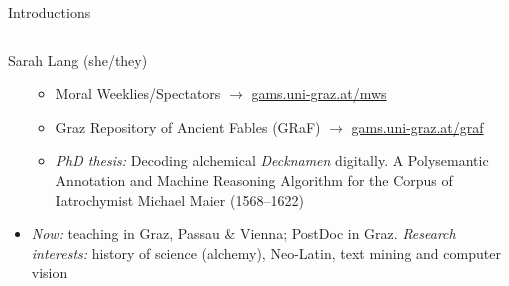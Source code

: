 \documentclass[10pt]{beamer}
\begin{document}
\begin{frame}{Introductions}
\begin{columns}[T,onlytextwidth]
\begin{block}{Sarah Lang (she/they)}
\begin{itemize}
          \begin{itemize}\scriptsize
              \item Moral Weeklies/Spectators $\to$ \protect\url{gams.uni-graz.at/mws}
              \item Graz Repository of Ancient Fables (GRaF) $\to$ \protect\url{gams.uni-graz.at/graf}
              \item \emph{PhD thesis:} Decoding alchemical \emph{Decknamen} digitally. A Polysemantic Annotation and Machine Reasoning Algorithm for the Corpus of Iatrochymist Michael Maier (1568--1622)
          \end{itemize}
          \item \emph{Now:} teaching in Graz, Passau \& Vienna; PostDoc in Graz. \emph{Research interests:} history of science (alchemy), Neo-Latin, text mining and computer vision
      \end{itemize}
      \end{block}
  \end{columns}
\end{frame}


%


%

%
%


%
%

%
%



\frame[allowframebreaks]{\AtNextBibliography{\footnotesize}\printbibliography}
\end{document}
